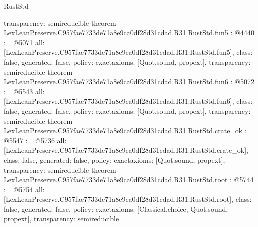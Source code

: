 \begin{lexlean}{RustStd}
\begin{coremodule}
{  transparency: semireducible
}
theorem LexLeanPreserve.C957fae7733de71a8e9ca0df28d31cdad.R31.RustStd.fun5 : @4440 := @5071 {
  all: [LexLeanPreserve.C957fae7733de71a8e9ca0df28d31cdad.R31.RustStd.fun5],
  class: false,
  generated: false,
  policy: exact{axioms: [Quot.sound, propext]},
  transparency: semireducible
}
theorem LexLeanPreserve.C957fae7733de71a8e9ca0df28d31cdad.R31.RustStd.fun6 : @5072 := @5543 {
  all: [LexLeanPreserve.C957fae7733de71a8e9ca0df28d31cdad.R31.RustStd.fun6],
  class: false,
  generated: false,
  policy: exact{axioms: [Quot.sound, propext]},
  transparency: semireducible
}
theorem LexLeanPreserve.C957fae7733de71a8e9ca0df28d31cdad.R31.RustStd.crate_ok : @5547 := @5736 {
  all: [LexLeanPreserve.C957fae7733de71a8e9ca0df28d31cdad.R31.RustStd.crate_ok],
  class: false,
  generated: false,
  policy: exact{axioms: [Quot.sound, propext]},
  transparency: semireducible
}
theorem LexLeanPreserve.C957fae7733de71a8e9ca0df28d31cdad.R31.RustStd.root : @5744 := @5754 {
  all: [LexLeanPreserve.C957fae7733de71a8e9ca0df28d31cdad.R31.RustStd.root],
  class: false,
  generated: false,
  policy: exact{axioms: [Classical.choice, Quot.sound, propext]},
  transparency: semireducible
}


\end{coremodule}
\end{lexlean}
